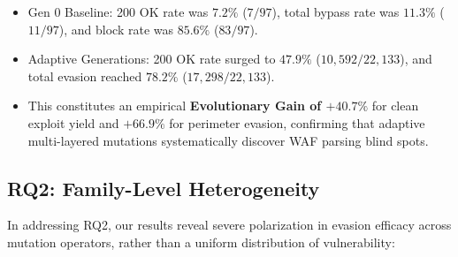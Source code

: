 \begin{enumerate}
  \begin{itemize}
    \item Gen 0 Baseline: 200 OK rate was $7.2\%$ ($7/97$), total bypass rate was $11.3\%$ ($11/97$), and block rate was $85.6\%$ ($83/97$).
    \item Adaptive Generations: 200 OK rate surged to $47.9\%$ ($10{,}592/22{,}133$), and total evasion reached $78.2\%$ ($17{,}298/22{,}133$).
    \item This constitutes an empirical \textbf{Evolutionary Gain of $+40.7\%$} for clean exploit yield and \textbf{$+66.9\%$} for perimeter evasion, confirming that adaptive multi-layered mutations systematically discover WAF parsing blind spots.
  \end{itemize}
\end{enumerate}

\subsection{RQ2: Family-Level Heterogeneity}
In addressing RQ2, our results reveal severe polarization in evasion efficacy across mutation operators, rather than a uniform distribution of vulnerability:
